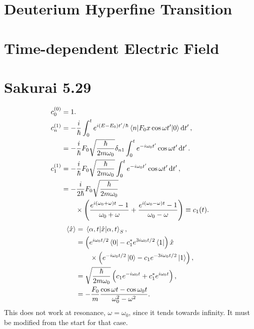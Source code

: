 \documentclass[
a4paper,
10pt,
twoside,
]{article}
\begin{document}
\titleinf
\maketitle
\startmcols

\section{Deuterium Hyperfine Transition}\label{sec: I}
\section{Time-dependent Electric Field}\label{sec: II}



\section{Sakurai 5.29}\label{sec: III}


\begin{align}
	c_0^{(0)} &= 1.\\
	c_n^{(1)}
	&= -\frac{i}{\hbar} \int_0^t e^{i(E-E_0)t'/\hbar} \mel*{n}{F_0x\cos\omega t'}{0} \dd{t'},\\
	&= -\frac{i}{\hbar} F_0 \sqrt{\frac{\hbar}{2m\omega_0}}\delta_{n1} \int_0^t e^{-i\omega_0 t'} \cos\omega t' \dd{t'}.\\
	c_1^{(1)}
	&= -\frac{i}{\hbar} F_0 \sqrt{\frac{\hbar}{2m\omega_0}} \int_0^t e^{-i\omega_0 t'} \cos\omega t' \dd{t'},\\
	&= -\frac{i}{2\hbar} F_0 \sqrt{\frac{\hbar}{2m\omega_0}}\nonumber\\
	 &\qquad \times \left( \frac{e^{i(\omega_0+\omega)t}-1}{\omega_0+\omega} + \frac{e^{i(\omega_0-\omega)t}-1}{\omega_0-\omega} \right) \equiv c_1(t).
\end{align}
\begin{align}
	\ev{\hat{x}} &= \ev*{\hat{x}}{\alpha,t}_S,\\
	&= \left(e^{i\omega_0 t/2}\bra{0} -c_1^*e^{3i\omega_0 t/2}\bra{1}\right)\hat{x}\\
	 &\qquad\times\left(e^{-i\omega_0 t/2}\ket{0} - c_1e^{-3i\omega_0 t/2}\ket{1}\right),\\
	&= \sqrt{\frac{\hbar}{2m\omega_0}} \left( c_1e^{-i\omega_0 t} + c_1^*e^{i\omega_0 t}\right),\\
	&= -\frac{F_0}{m} \frac{\cos\omega t - \cos\omega_0 t}{\omega_0^2 - \omega^2}.
\end{align}
This does not work at resonance, $\omega = \omega_0$, since it tends towards infinity.
It must be modified from the start for that case.
\end{document}
